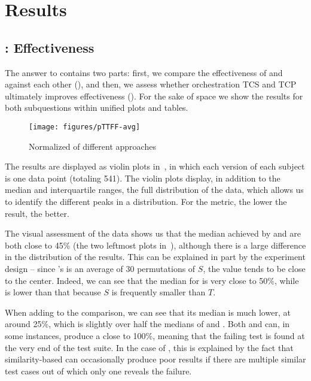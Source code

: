 \section{Results}\label{sec:orch_results}

\subsection{: Effectiveness}
\label{subsec:rq1}

The answer to  contains two parts: first, we compare the effectiveness of \ek and \fs against each other (), and then, we assess
whether orchestration TCS and TCP ultimately improves effectiveness (). 
For the sake of space we show the results for both subquestions within unified plots and tables.

\begin{figure}[t]
  \centering
  \texttt{[image: figures/pTTFF-avg]}
  \caption{Normalized \ttff of different approaches}
  \label{fig:ttff_avg}
  \vspace{-3mm}
\end{figure}

The \pttff results 
are displayed as violin plots in~, in which each version of each subject is one data point (totaling 541).
The violin plots display, in addition to the median and interquartile ranges, the full distribution of the data, 
which allows us to identify the different peaks in a distribution. 
For the \pttff metric, the lower the result, the better.

The visual assessment of the data shows us that the median \pttff achieved by \ek and \fs are both close to 45\% (the two leftmost plots in~), although there is a large difference in the distribution of the results.
This can be explained in part by the experiment design -- since \ek's \pttff is an average of 30 permutations of $S$, the value tends to be close to the center.
Indeed, we can see that the median for \rnd is very close to 50\%, while \ek is lower than that because $S$ is frequently smaller than $T$.

When adding \fz to the comparison, we can see that its median \pttff is much lower, at around 25\%, which is slightly over half the medians of \ek and \fs.
Both \fs and \fz can, in some instances, produce a \pttff close to 100\%, meaning that the failing test is found at the very end of the test suite.
In the case of \fs, this is explained by the fact that similarity-based \tcp can occasionally produce poor results if there are multiple similar test cases out of which only one reveals the failure.

